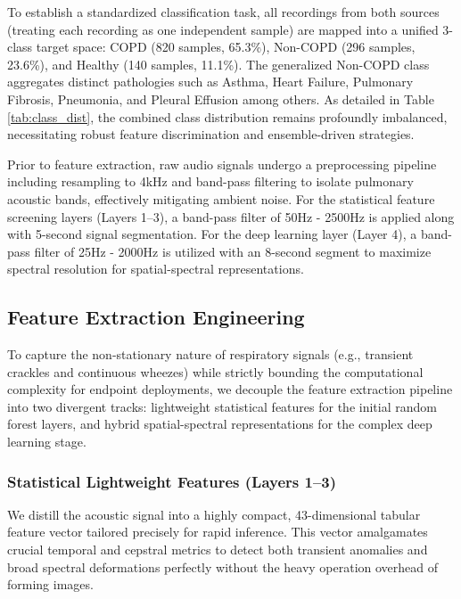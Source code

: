 To establish a standardized classification task, all recordings from both sources (treating each recording as one independent sample) are mapped into a unified 3-class target space: COPD (820 samples, 65.3\%), Non-COPD (296 samples, 23.6\%), and Healthy (140 samples, 11.1\%). The generalized Non-COPD class aggregates distinct pathologies such as Asthma, Heart Failure, Pulmonary Fibrosis, Pneumonia, and Pleural Effusion among others. As detailed in Table \ref{tab:class_dist}, the combined class distribution remains profoundly imbalanced, necessitating robust feature discrimination and ensemble-driven strategies.

Prior to feature extraction, raw audio signals undergo a preprocessing pipeline including resampling to 4kHz and band-pass filtering to isolate pulmonary acoustic bands, effectively mitigating ambient noise. For the statistical feature screening layers (Layers 1--3), a band-pass filter of 50Hz - 2500Hz is applied along with 5-second signal segmentation. For the deep learning layer (Layer 4), a band-pass filter of 25Hz - 2000Hz is utilized with an 8-second segment to maximize spectral resolution for spatial-spectral representations.

\subsection{Feature Extraction Engineering}
To capture the non-stationary nature of respiratory signals (e.g., transient crackles and continuous wheezes) while strictly bounding the computational complexity for endpoint deployments, we decouple the feature extraction pipeline into two divergent tracks: lightweight statistical features for the initial random forest layers, and hybrid spatial-spectral representations for the complex deep learning stage.

\subsubsection{Statistical Lightweight Features (Layers 1--3)}
We distill the acoustic signal into a highly compact, 43-dimensional tabular feature vector tailored precisely for rapid inference. This vector amalgamates crucial temporal and cepstral metrics to detect both transient anomalies and broad spectral deformations perfectly without the heavy operation overhead of forming images.

